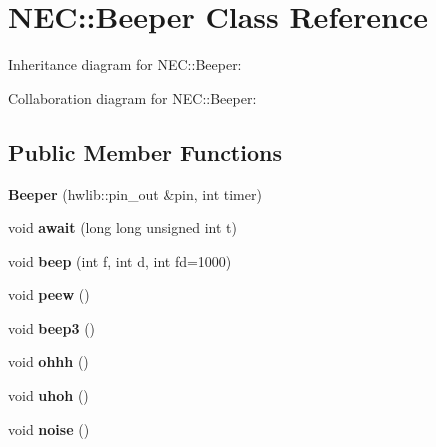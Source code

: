 \hypertarget{classNEC_1_1Beeper}{}\section{N\+EC\+:\+:Beeper Class Reference}
\label{classNEC_1_1Beeper}


Inheritance diagram for N\+EC\+:\+:Beeper\+:


Collaboration diagram for N\+EC\+:\+:Beeper\+:
\subsection*{Public Member Functions}
\begin{DoxyCompactItemize}
\item 
\mbox{\label{classNEC_1_1Beeper_a57581aa4168a63ff6422fd6432588023}} 
{\bfseries Beeper} (hwlib\+::pin\+\_\+out \&pin, int timer)
\item 
\mbox{\label{classNEC_1_1Beeper_a20c86d6aa760a8910ff432040a16d144}} 
void {\bfseries await} (long long unsigned int t)
\item 
\mbox{\label{classNEC_1_1Beeper_a93fbcec9031d76bb202ab37daff0c65a}} 
void {\bfseries beep} (int f, int d, int fd=1000)
\item 
\mbox{\label{classNEC_1_1Beeper_a35236ed8f27643a8113c178068e8b485}} 
void {\bfseries peew} ()
\item 
\mbox{\label{classNEC_1_1Beeper_a3fc22b61300ffa46b502c2a9d95ad4f7}} 
void {\bfseries beep3} ()
\item 
\mbox{\label{classNEC_1_1Beeper_a966a6bee8221839002607d10a3d0b4f3}} 
void {\bfseries ohhh} ()
\item 
\mbox{\label{classNEC_1_1Beeper_ac756c45b83ab0543c4c9e8c203790255}} 
void {\bfseries uhoh} ()
\item 
\mbox{\label{classNEC_1_1Beeper_abbc0de2efe2e11ef62937db1fa37949a}} 
void {\bfseries noise} ()
\item 
\mbox{\label{classNEC_1_1Beeper_a5a50d79ac5b31818099c739dbcb0365d}} 

\end{DoxyCompactItemize}
